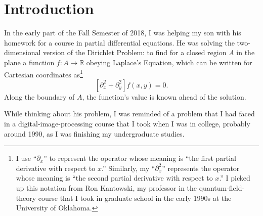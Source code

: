 \documentclass{article}
\newcommand{\R}{\ensuremath{\mathbb{R}}}
\begin{document}
\section{Introduction}

In the early part of the Fall Semester of 2018, I was helping my son with his
homework for a course in partial differential equations.  He was solving the
two-dimensional version of the Dirichlet Problem: to find for a closed region
$A$ in the plane a function $f: A \rightarrow \R$ obeying Laplace's Equation,
which can be written for Cartesian coordinates as\footnote{%
   I use ``$\partial_x$'' to represent the operator whose meaning is ``the
   first partial derivative with respect to $x$.'' Similarly, my
   ``$\partial_x^2$'' represents the operator whose meaning is ``the second
   partial derivative with respect to $x$.'' I picked up this notation from Ron
   Kantowski, my professor in the quantum-field-theory course that I took in
   graduate school in the early 1990s at the University of Oklahoma.}
\begin{equation}
   \left[\partial_x^2 + \partial_y^2\right] f(x,y) = 0.
\end{equation}
Along the boundary of $A$, the function's value is known ahead of the solution.

While thinking about his problem, I was reminded of a problem that I had faced
in a digital-image-processing course that I took when I was in college,
probably around 1990, as I was finishing my undergraduate studies.
\end{document}
